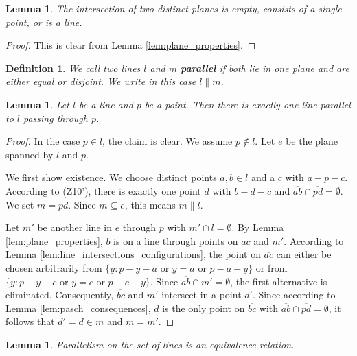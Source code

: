 \documentclass[11pt,a4paper]{article}
\newcommand{\betw}[3]{#1 - #2 - #3}
\newcommand{\lineab}[1]{\overline{#1}}
\newtheorem{lemma}[theorem]{Lemma}
\newtheorem{definition}[theorem]{Definition}
\begin{document}
\begin{lemma} \label{lem:plane_intersection}
The intersection of two distinct planes is empty, consists of a single point, or is a line.
\end{lemma}
\begin{proof}
This is clear from Lemma \ref{lem:plane_properties}.
\end{proof}

\begin{definition} \label{def:parallel_lines}
We call two lines $l$ and $m$ \textbf{parallel} if both lie in one plane and are either equal or disjoint. We write in this case $l \parallel m$.
\end{definition}

\begin{lemma} \label{lem:parallel_postulate}
Let $l$ be a line and $p$ be a point. Then there is exactly one line parallel to $l$ passing through $p$.
\end{lemma}

\begin{proof}
In the case $p \in l$, the claim is clear. We assume $p \notin l$. Let $e$ be the plane spanned by $l$ and $p$.

We first show existence. We choose distinct points $a, b \in l$ and a $c$ with $\betw{a}{p}{c}$. According to (Z10'), there is exactly one point $d$ with $\betw{b}{d}{c}$ and $\lineab{ab} \cap \lineab{pd} = \emptyset$. We set $m = \lineab{pd}$. Since $m \subseteq e$, this means $m \parallel l$.

Let $m'$ be another line in $e$ through $p$ with $m' \cap l = \emptyset$. By Lemma \ref{lem:plane_properties}, $b$ is on a line through points on $\lineab{ac}$ and $m'$. According to Lemma \ref{lem:line_intersections_configurations}, the point on $\lineab{ac}$ can either be chosen arbitrarily from $\{y : \betw{p}{y}{a} \text{ or } y = a \text{ or } \betw{p}{a}{y}\}$ or from $\{y : \betw{p}{y}{c} \text{ or } y = c \text{ or } \betw{p}{c}{y}\}$. Since $\lineab{ab} \cap m' = \emptyset$, the first alternative is eliminated. Consequently, $\lineab{bc}$ and $m'$ intersect in a point $d'$. Since according to Lemma \ref{lem:pasch_consequences}, $d$ is the only point on $\lineab{bc}$ with $\lineab{ab} \cap \lineab{pd} = \emptyset$, it follows that $d' = d \in m$ and $m = m'$.
\end{proof}

\begin{lemma} \label{lem:parallel_equivalence}
Parallelism on the set of lines is an equivalence relation.
\end{lemma}
\end{document}
